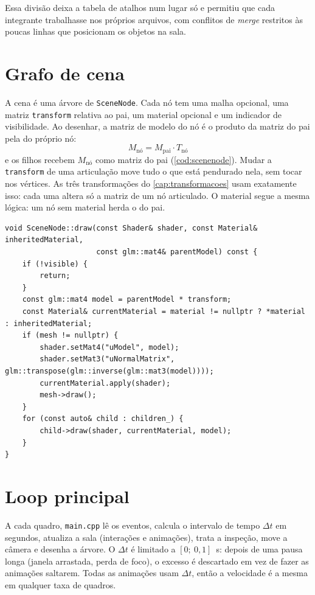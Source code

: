 \documentclass[
  12pt,          %
  oneside,       %
  a4paper,       %
  chapter=TITLE, %
  english,
  brazil,        %
]{abntex2}
\newcommand{\fonteautores}{\fonte{Elaborado pelos autores (2026).}}
\begin{document}
Essa divisão deixa a tabela de atalhos num lugar só e permitiu que cada integrante trabalhasse nos próprios
arquivos, com conflitos de \emph{merge} restritos às poucas linhas que posicionam os objetos na sala.

\section{Grafo de cena}

A cena é uma árvore de \texttt{SceneNode}. Cada nó tem uma malha opcional, uma matriz \texttt{transform}
relativa ao pai, um material opcional e um indicador de visibilidade. Ao desenhar, a matriz de modelo do nó é
o produto da matriz do pai pela do próprio nó:
\begin{equation}
  M_{\text{nó}} = M_{\text{pai}} \cdot T_{\text{nó}}
  \label{eq:hierarquia}
\end{equation}
e os filhos recebem $M_{\text{nó}}$ como matriz do pai (\autoref{cod:scenenode}). Mudar a
\texttt{transform} de uma articulação move tudo o que está pendurado nela, sem tocar nos vértices. As três
transformações do \autoref{cap:transformacoes} usam exatamente isso: cada uma altera só a matriz de um nó
articulado. O material segue a mesma lógica: um nó sem material herda o do pai.

\begin{lstlisting}[caption={Desenho recursivo do grafo de cena (\texttt{src/gfx/scene\_node.cpp}, sem comentários)},label={cod:scenenode}]
void SceneNode::draw(const Shader& shader, const Material& inheritedMaterial,
                     const glm::mat4& parentModel) const {
    if (!visible) {
        return;
    }
    const glm::mat4 model = parentModel * transform;
    const Material& currentMaterial = material != nullptr ? *material : inheritedMaterial;
    if (mesh != nullptr) {
        shader.setMat4("uModel", model);
        shader.setMat3("uNormalMatrix", glm::transpose(glm::inverse(glm::mat3(model))));
        currentMaterial.apply(shader);
        mesh->draw();
    }
    for (const auto& child : children_) {
        child->draw(shader, currentMaterial, model);
    }
}
\end{lstlisting}
\fonteautores

\section{Loop principal}

A cada quadro, \texttt{main.cpp} lê os eventos, calcula o intervalo de tempo $\Delta t$ em segundos, atualiza a
sala (interações e animações), trata a inspeção, move a câmera e desenha a árvore. O $\Delta t$ é limitado a
$[0;\ 0{,}1]$~s: depois de uma pausa longa (janela arrastada, perda de foco), o excesso é descartado em vez de
fazer as animações saltarem. Todas as animações usam $\Delta t$, então a velocidade é a mesma em qualquer taxa
de quadros.
\end{document}
